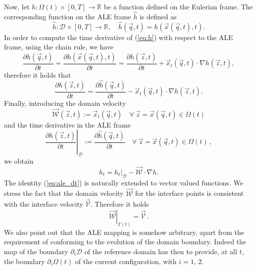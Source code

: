 \documentclass[a4paper,12pt,onecolumn]{article}
\newcommand{\R}{\mathbb R}
\newcommand{\D}{\mathcal D}
\newcommand{\W}{\vec{\mathcal W}}
\newcommand{\V}{\vec{\mathcal{V}}} %
\begin{document}
Now, let $h:\Omega(t)\times [0,T]\to \R$ be a function defined on the Eulerian
frame. The corresponding function on the ALE frame $\hat h$ is defined as
\begin{equation}\label{eq:h}
\hat h:\D\times [0,T]\to \R,\quad \hat h(\vec q,t)=h(\vec x(\vec q,t),t).
\end{equation}
In order to compute the time derivative of (\ref{eq:h}) with respect to the ALE
frame, using the chain rule, we have
\begin{equation}
\frac{\partial\hat h(\vec q,t)}{\partial t}=\frac{\partial h(\vec x(\vec
q,t),t)}{\partial t}=\frac{\partial h(\vec z,t)}{\partial t}+\vec x_t(\vec q,t)
\cdot \nabla h(\vec z,t),
\end{equation}
therefore it holds that
\begin{equation}
\frac{\partial h(\vec z,t)}{\partial t} =
\frac{\partial\hat h(\vec q,t)}{\partial t}-
\vec x_t(\vec q,t) \cdot \nabla h(\vec z,t).
\end{equation}
Finally, introducing the domain velocity
\begin{equation} \label{eq:W}
\W(\vec z, t) := \vec x_t(\vec q, t) \quad \forall\ \vec z = \vec x(\vec q,t)
\in \Omega(t)
\end{equation}
and the time derivative in the ALE frame
\begin{equation} \label{eq:ale_derivative}
\left.\frac{\partial h(\vec z,t)}{\partial t}\right|_{\D}:=
\frac{\partial\hat h(\vec q,t)}{\partial t} \quad
\forall\ \vec z = \vec x(\vec q,t) \in \Omega(t)\,,
\end{equation}
we obtain
\begin{equation}\label{eq:ale_dt}
h_t =\left.h_t\right|_{\D} -\vec{\mathcal{W}} \cdot \nabla h.
\end{equation}
The identity (\ref{eq:ale_dt}) is naturally extended to vector valued functions.
We stress the fact that the domain velocity $\W$ for the interface points is
consistent with the interface velocity $\V$. Therefore it holds
\begin{equation}
\left.\W \right|_{\Gamma(t)}=\V\,.
\end{equation}
We also point out that the ALE mapping is somehow arbitrary, apart from the
requirement of conforming to the evolution of the domain boundary. Indeed the
map of the boundary $\partial_i \D$ of the reference domain has then to
provide, at all $t$, the boundary $\partial_i \Omega(t)$ of the current
configuration, with $i=1,\,2$.
\end{document}
